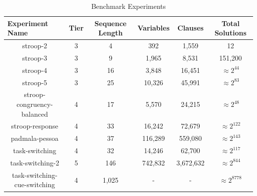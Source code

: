 \begin{table}[t]
  \centering
  \caption{Benchmark Experiments}
\begin{tabular}{|c|c|c|c|c|c|}
\hline
\multicolumn{1}{|l|}{Experiment Name} & Tier  & Sequence Length & Variables  & Clauses    & Total Solutions    \\ \hline
stroop-2                              & 3     & 4               & 392        & 1,559      & 12                 \\ \hline
stroop-3                              & 3     & 9               & 1,965      & 8,531      & 151,200            \\ \hline
stroop-4                              & 3     & 16              & 3,848      & 16,451     & $\approx 2^{44}$   \\ \hline
stroop-5                              & 3     & 25              & 10,326     & 45,991     & $\approx 2^{83}$   \\ \hline
stroop-congruency-balanced            & 4     & 17              & 5,570      & 24,215     & $\approx 2^{48}$   \\ \hline
stroop-response                       & 4     & 33              & 16,242     & 72,679     & $\approx 2^{122}$  \\ \hline
padmala-pessoa                        & 4     & 37              & 116,289    & 559,080    & $\approx 2^{143}$  \\ \hline
task-switching                        & 4     & 32              & 14,246     & 62,700     & $\approx 2^{117}$  \\ \hline
task-switching-2                      & 5     & 146             & 742,832    & 3,672,632  & $\approx 2^{844}$  \\ \hline
task-switching-cue-switching          & 4     & 1,025           & -          & -          & $\approx 2^{8778}$ \\ \hline
\end{tabular}
\label{tab:benchmark_experiments}%
\end{table}



